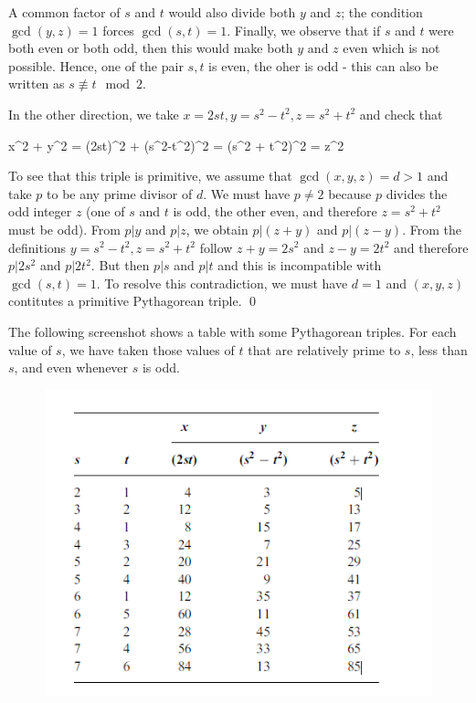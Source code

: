 A common factor of $s$ and $t$ would also divide both $y$ and $z$; the condition $\gcd(y,z) = 1$ forces $\gcd(s,t) = 1$. Finally, we observe that if $s$ and $t$ were both even or both odd, then this would make both $y$ and $z$ even which is not possible. Hence, one of the pair $s,t$ is even, the oher is odd - this can also be written as $s \not\equiv t \mod 2$.

In the other direction, we take $x = 2st, y = s^2-t^2, z = s^2 + t^2$ and check that

\bee
x^2 + y^2 = (2st)^2 + (s^2-t^2)^2 = (s^2 + t^2)^2 = z^2
\eee

To see that this triple is primitive, we assume that $\gcd(x,y,z) = d > 1$ and take $p$ to be any prime divisor of $d$. We must have $p \neq 2$ because $p$ divides the odd integer $z$ (one of $s$ and $t$ is odd, the other even, and therefore $z = s^2 + t^2$ must be odd). From $p | y$ and $p|z$, we obtain $p | (z+y)$ and $p | (z-y)$. From the definitions $y = s^2-t^2, z = s^2 + t^2$ follow $z+y=2s^2$ and $z-y=2t^2$ and therefore $p|2s^2$ and $p|2t^2$. But then $p|s$ and $p|t$ and this is incompatible with $\gcd(s,t)=1$. To resolve this contradiction, we must have $d=1$ and $(x,y,z)$ contitutes a primitive Pythagorean triple. \qed

The following screenshot shows a table with some Pythagorean triples. For each value of $s$, we have taken those values of $t$ that are relatively prime to $s$, less than $s$, and even whenever $s$ is odd.

\begin{figure}[H]
    \centering
    \includegraphics[scale=0.75]{images/2023-03-28-triples.png}
\end{figure}

